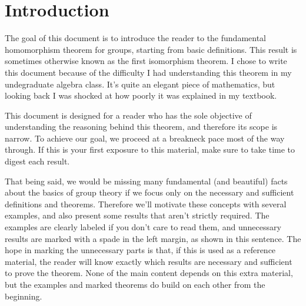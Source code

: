 \section*{Introduction}
\markright{}

The goal of this document is to introduce the reader to the fundamental homomorphism theorem for groups, starting from basic definitions. This result is sometimes otherwise known as the first isomorphism theorem. I chose to write this document because of the difficulty I had understanding this theorem in my undegraduate algebra class. It's quite an elegant piece of mathematics, but looking back I was shocked at how poorly it was explained in my textbook.

This document is designed for a reader who has the sole objective of understanding the reasoning behind this theorem, and therefore its scope is narrow. To achieve our goal, we proceed at a breakneck pace most of the way through. If this is your first exposure to this material, make sure to take time to digest each result.

That being said, we would be missing many fundamental (and beautiful) facts about the basics of  group theory if we focus only on the necessary and sufficient definitions and theorems. Therefore we'll motivate these concepts with several examples, and also present some results that aren't strictly required. \extra The examples are clearly labeled if you don't care to read them, and unnecessary results are marked with a spade in the left margin, as shown in this sentence. The hope in marking the unnecessary parts is that, if this is used as a reference material, the reader will know exactly which results are necessary and sufficient to prove the theorem. None of the main content depends on this extra material, but the examples and marked theorems do build on each other from the beginning.